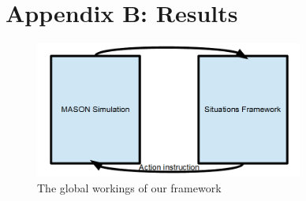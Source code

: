 \documentclass[11pt]{book}
\begin{document}
\chapter{Appendix B: Results}
\begin{figure}
\centering
\includegraphics[width=250pt]{framework}
\caption{The global workings of our framework}
\label{framework}
\end{figure}






\end{document}
